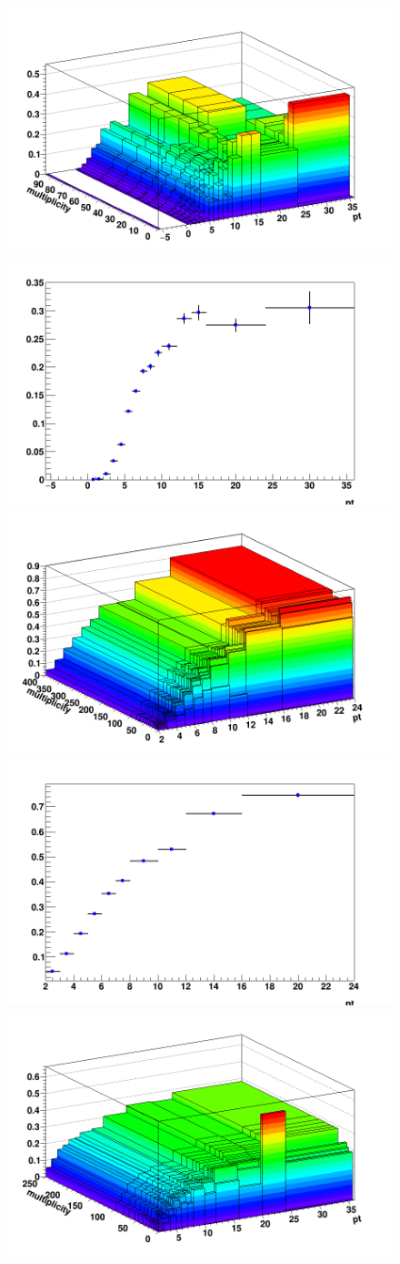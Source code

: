 \begin{figure}[h]   %
	\centering
	\includegraphics[width=.48\linewidth]{figures/Effs/EfficiencyMap_2D_DPlus_b_Ref_wLimAcc_Plot.png}
	\includegraphics[width=.48\linewidth]{figures/Effs/EfficiencyMap_1D_DPlus_b_Ref_wLimAcc_Plot.png}
	\includegraphics[width=.48\linewidth]{figures/Effs/EfficiencyMap_2D_DStar_b_Ref_wLimAcc_Plot.png}
	\includegraphics[width=.48\linewidth]{figures/Effs/EfficiencyMap_1D_DStar_b_Ref_wLimAcc_Plot.png}
	\includegraphics[width=.48\linewidth]{figures/Effs/EfficiencyMap_2D_Dzero_b_RefPtBins_wLimAcc_Plot.png}

\end{figure}
